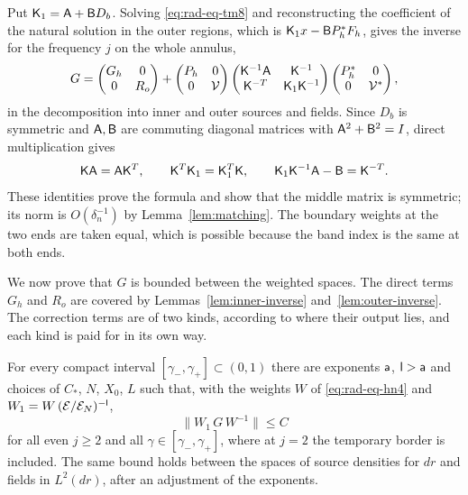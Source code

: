 Put $\mathsf K_1=\mathsf A+\mathsf B D_b$. Solving \eqref{eq:rad-eq-tm8} and
reconstructing the coefficient of the natural solution in the outer
regions, which is $\mathsf K_1x-\mathsf B P_h^*F_h$, gives the inverse for the
frequency $j$ on the whole annulus,
\begin{equation}\label{eq:rad-eq-tm11}
 G=\begin{pmatrix}G_h&0\\0&R_o\end{pmatrix}
  +\begin{pmatrix}P_h&0\\0&\mathcal V\end{pmatrix}
   \begin{pmatrix}
       \mathsf K^{-1}\mathsf A&\mathsf K^{-1}\\\mathsf K^{-T}&\mathsf K_1\mathsf K^{-1}
   \end{pmatrix}
   \begin{pmatrix}P_h^*&0\\0&\mathcal V^*\end{pmatrix},
\end{equation}
in the decomposition into inner and outer sources and fields. Since
$D_b$ is symmetric and $\mathsf A,\mathsf B$ are commuting diagonal matrices with
$\mathsf A^2+\mathsf B^2=I$, direct multiplication gives
\[
 \mathsf K\mathsf A=\mathsf A\mathsf K^T,\qquad \mathsf K^T\mathsf K_1=\mathsf K_1^T\mathsf K,\qquad
 \mathsf K_1\mathsf K^{-1}\mathsf A-\mathsf B=\mathsf K^{-T}.
\]
These identities prove the formula and show that the middle matrix is
symmetric; its norm is $O(\delta_n^{-1})$ by Lemma~\ref{lem:matching}.
The boundary weights at the two ends are taken equal, which is
possible because the band index is the same at both ends.

We now prove that $G$ is bounded between the weighted spaces. The
direct terms $G_h$ and $R_o$ are covered by
Lemmas~\ref{lem:inner-inverse} and~\ref{lem:outer-inverse}. The
correction terms are of two kinds, according to where their output
lies, and each kind is paid for in its own way.

\begin{proposition}
\label{prop:global-reference-bound}
For every compact interval $[\gamma_-,\gamma_+]\subset(0,1)$ there are
exponents $\mathsf a$, $\mathsf l>\mathsf a$ and choices of $C_*$, $N$, $X_0$, $L$ such
that, with the weights $W$ of \eqref{eq:rad-eq-hn4} and
$W_1=W\,(\mathcal E/\mathcal E_N)^{-\mathsf l}$,
\begin{equation}\label{eq:global-reference-bound-new}
 \|W_1\,G\,W^{-1}\|\le C
\end{equation}
for all even $j\ge2$ and all $\gamma\in[\gamma_-,\gamma_+]$, where at
$j=2$ the temporary border is included. The same bound holds between
the spaces of source densities for $dr$ and fields in $L^2(dr)$, after
an adjustment of the exponents.
\end{proposition}

